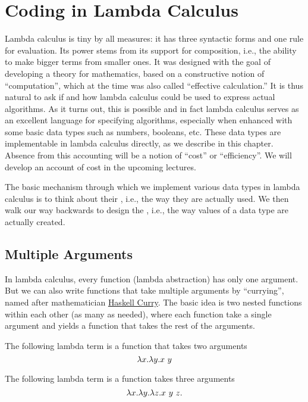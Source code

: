 \chapter{Coding in Lambda Calculus}
\label{ch:lcc}


Lambda calculus is tiny by all measures: it has three syntactic forms and one rule for evaluation.  
%
Its power stems from its support for composition, i.e., the ability to make bigger terms from smaller ones. 
%
It was designed with the goal of developing a theory for mathematics,  based on a constructive notion of ``computation'', which at the time was also called ``effective calculation.''
%
It is thus natural to ask if and how lambda calculus could be used to express actual algorithms.   As it turns out, this is possible and in fact lambda calculus serves as an excellent language for specifying algorithms, especially when enhanced with some basic data types such as numbers, booleans, etc.
%
These data types are implementable in lambda calculus directly, as we describe
in this chapter.
%
Absence from this accounting will be a notion of ``cost'' or ``efficiency''.
%
We will develop an account of cost in the upcoming lectures.

\begin{gram}

The basic mechanism through which we implement various data types in lambda calculus is to think about their , i.e., the way they are actually used.  
%
We then walk our way backwards to design the , i.e., the way values of a data type are actually created. 
\end{gram}

\section{Multiple Arguments}
In lambda calculus, every function (lambda abstraction) has only one
argument.  
%
But we can also write functions that take multiple arguments by ``currying'', named after mathematician \href{https://en.wikipedia.org/wiki/Haskell_Curry}{Haskell Curry}.
%
The basic idea is two nested functions within each other (as many as needed), where each function take a single argument and yields a function that takes the rest of the arguments.

\begin{example}[Currying]
The following lambda term is a function that takes two arguments
\[
\lambda x. \lambda y. x~y
\]

The following lambda term is a function takes three arguments
\[
\lambda x. \lambda y. \lambda z. x~y~z.
\]
\end{example}

